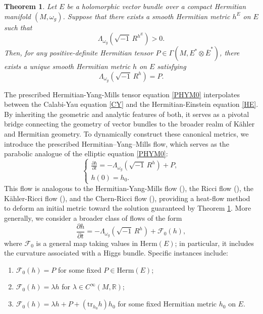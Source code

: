 \documentclass[12pt, reqno]{amsart}
\theoremstyle{plain}
\newtheorem{theorem}{Theorem}[section]
\theoremstyle{definition}
\renewcommand{\bar}{\overline}
\newcommand{\beq}{\begin{equation}}
\newcommand{\eeq}{\end{equation}}
\renewcommand{\>}{\rightarrow}
\newcommand{\R}{{\mathbb R}}
\renewcommand{\>}{\rightarrow}
\newcommand{\om}{\omega}
\renewcommand{\bar}{\overline}
\numberwithin{equation}{section} %
\begin{document}
    \begin{theorem}\label{thm:bundle_CY_intro}
        Let $E$ be a holomorphic vector bundle over a compact Hermitian manifold $(M, \om_g)$. Suppose that there exists a smooth Hermitian metric $h^E$ on $E$ such that
        \[
        \Lambda_{\om_g}\left(\sqrt{-1}\, R^{h^E}\right) > 0.
        \]
        Then, for any positive-definite Hermitian tensor $P \in \Gamma\left(M, E^* \otimes \bar{E}^*\right)$, there exists a unique smooth Hermitian metric $h$ on $E$ satisfying
        \beq
        \Lambda_{\om_g}\left(\sqrt{-1}\, R^{h}\right) = P.\label{PHYM0}
        \eeq
    \end{theorem}

\noindent  The prescribed Hermitian-Yang-Mills tensor equation \eqref{PHYM0} interpolates between the Calabi-Yau equation \eqref{CY} and the Hermitian-Einstein equation \eqref{HE}. By inheriting the geometric and analytic features of both, it serves as a pivotal bridge connecting the geometry of vector bundles to the broader realm of K\"ahler and Hermitian geometry.
To dynamically construct these canonical metrics, we introduce the  prescribed Hermitian--Yang--Mills flow, which serves as the parabolic analogue of the elliptic equation \eqref{PHYM0}:
    \begin{equation}
    \label{PHYMF}
    \begin{cases}
    \displaystyle \frac{\partial h}{\partial t} = -\Lambda_{\om_g}\left(\sqrt{-1}\, R^h\right) + P, \\[10pt]
    h(0) = h_0.
    \end{cases}\end{equation}
This flow is analogous to the Hermitian-Yang-Mills flow (\cite{Don85}), the Ricci flow (\cite{Ham82}), the K\"ahler-Ricci flow (\cite{Cao85}),   and  the Chern-Ricci flow (\cite{TW15}), providing a heat-flow method to deform an initial metric toward the  solution guaranteed by Theorem \ref{thm:bundle_CY_intro}. More generally, we consider a broader class of flows of the form
\begin{equation}
\label{GHYMF}
\frac{\partial h}{\partial t} = -\Lambda_{\omega_g}\left(\sqrt{-1}\, R^h\right) + \mathcal{F}_0(h),
\end{equation}
where $\mathcal{F}_0$ is a general map taking values in $\mathrm{Herm}(E)$; in particular, it includes the curvature associated with a Higgs bundle. Specific instances include:
\begin{enumerate}[label=(\roman*)]
    \item $\mathcal{F}_0(h) = P$ for some fixed $P \in \mathrm{Herm}(E)$;
    \item $\mathcal{F}_0(h) = \lambda h$ for $\lambda \in C^\infty(M, \R)$;
    \item $\mathcal{F}_0(h) = \lambda h + P + (\mathrm{tr}_{h_0} h) h_0$ for some fixed Hermitian metric $h_0$ on $E$.
\end{enumerate}
\end{document}
